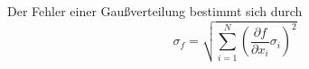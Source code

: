 Der Fehler einer Gaußverteilung bestimmt sich durch
\begin{equation}
  \sigma_{f} = \sqrt{\sum_{i = 1}^N \left(\frac{\partial f}{\partial x_{i}}
    \sigma_{i} \right)^2}
\end{equation}
